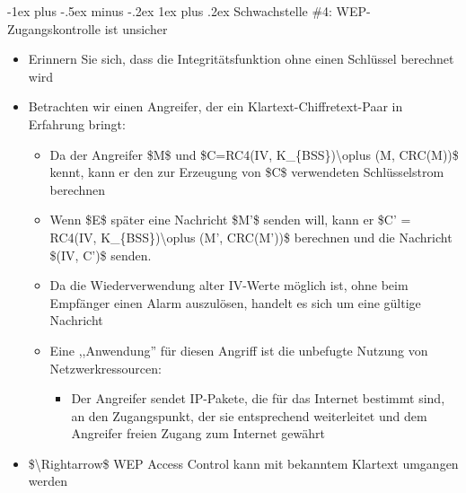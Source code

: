 \documentclass[a4paper]{article}
\makeatletter
\renewcommand{\subsubsection}{\@startsection{subsubsection}{3}{0mm}%
 {-1ex plus -.5ex minus -.2ex}%
 {1ex plus .2ex}%
 {\normalfont\small\bfseries}}
\makeatother
\begin{document}
\begin{multicols}{3}
    \subsubsection{Schwachstelle \#4: WEP-Zugangskontrolle ist
        unsicher}

    \begin{itemize}
        \item
              Erinnern Sie sich, dass die Integritätsfunktion ohne einen Schlüssel
              berechnet wird
        \item
              Betrachten wir einen Angreifer, der ein Klartext-Chiffretext-Paar in
              Erfahrung bringt:

              \begin{itemize}
                  \item
                        Da der Angreifer \$M\$ und \$C=RC4(IV,
                        K\_\{BSS\})\textbackslash oplus (M, CRC(M))\$ kennt, kann er den zur
                        Erzeugung von \$C\$ verwendeten Schlüsselstrom berechnen
                  \item
                        Wenn \$E\$ später eine Nachricht \$M'\$ senden will, kann er \$C' =
                        RC4(IV, K\_\{BSS\})\textbackslash oplus (M', CRC(M'))\$ berechnen
                        und die Nachricht \$(IV, C')\$ senden.
                  \item
                        Da die Wiederverwendung alter IV-Werte möglich ist, ohne beim
                        Empfänger einen Alarm auszulösen, handelt es sich um eine gültige
                        Nachricht
                  \item
                        Eine ,,Anwendung'' für diesen Angriff ist die unbefugte Nutzung von
                        Netzwerkressourcen:

                        \begin{itemize}
                            \item
                                  Der Angreifer sendet IP-Pakete, die für das Internet bestimmt
                                  sind, an den Zugangspunkt, der sie entsprechend weiterleitet und
                                  dem Angreifer freien Zugang zum Internet gewährt
                        \end{itemize}
              \end{itemize}
        \item
              \$\textbackslash Rightarrow\$ WEP Access Control kann mit bekanntem
              Klartext umgangen werden
    \end{itemize}



\end{multicols}
\end{document}
